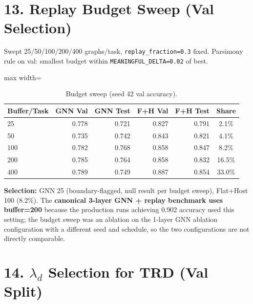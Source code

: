 \documentclass[11pt,a4paper]{article}
\begin{document}
\section*{13. Replay Budget Sweep (Val Selection)}
Swept 25/50/100/200/400 graphs/task, \texttt{replay\_fraction=0.3} fixed. Parsimony rule on val: smallest budget within \texttt{MEANINGFUL\_DELTA=0.02} of best.

\begin{table}[H]
\centering
\caption{Budget sweep (seed 42 val accuracy).}
\label{tab:budget-sweep}
\begin{adjustbox}{max width=\textwidth}
\begin{tabular}{lrrrrc}
\toprule
Buffer/Task & GNN Val & GNN Test & F+H Val & F+H Test & Share \\
\midrule
25 & 0.778 & 0.721 & 0.827 & 0.791 & 2.1\% \\
50 & 0.735 & 0.742 & 0.843 & 0.821 & 4.1\% \\
100 & 0.782 & 0.768 & 0.858 & 0.847 & 8.2\% \\
200 & 0.785 & 0.764 & 0.858 & 0.832 & 16.5\% \\
400 & 0.789 & 0.749 & 0.887 & 0.854 & 33.0\% \\
\bottomrule
\end{tabular}
\end{adjustbox}
\end{table}

\textbf{Selection:} GNN 25 (boundary-flagged, null result per budget sweep), Flat+Host 100 (8.2\%). The \textbf{canonical 3-layer GNN + replay benchmark uses buffer=200} because the production runs achieving \num{0.902} accuracy used this setting; the budget sweep was an ablation on the 1-layer GNN ablation configuration with a different seed and schedule, so the two configurations are not directly comparable.

\section*{14. $\lambda_d$ Selection for TRD (Val Split)}
\end{document}
